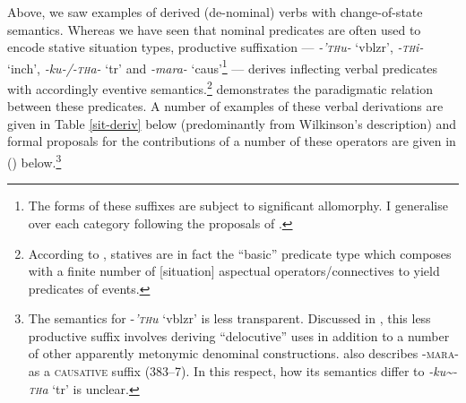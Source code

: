 


Above, we saw examples of derived (de-nominal) verbs with change-of-state semantics. Whereas we have seen that nominal predicates are often used to encode stative situation types, productive suffixation --- \textit{-’\textsc{th}u-} `\gls{vblzr}', \textit{-\textsc{th}i-} `\gls{inch}', \textit{-ku-/-\textsc{th}a-} `\gls{tr}' and \textit{-mara-} `\gls{caus}'\footnote{The forms of these  suffixes are subject to significant allomorphy. I generalise over each category following the proposals of \citet[§ 7.5]{Wilkinson1991}.} --- derives inflecting verbal predicates with accordingly eventive semantics.\footnote{According to \citet{Dowty1972,Dowty1979}, statives are in fact the ``basic'' predicate type which composes with a finite number of [situation] aspectual operators/connectives to yield predicates of events.} \citet{Wilkinson1991} demonstrates the paradigmatic relation between these predicates. A number of examples of these verbal derivations are given in Table \ref{sit-deriv} below (predominantly from Wilkinson's description) and formal proposals for the contributions of a number of these operators are given in (\nextx) below.\footnote{The semantics for -\textit{\textsc{'th}u} `\gls{vblzr}' is less transparent. Discussed in \citet[375--9]{Wilkinson1991}, this less productive suffix involves deriving ``delocutive'' uses in addition to a number of other apparently metonymic denominal constructions. \citeauthor{Wilkinson1991} also describes \textsc{-mara-} as a \textsc{causative} suffix (383--7). In this respect, how its semantics differ to \textit{-ku\textasciitilde-\textsc{th}a} `\gls{tr}' is unclear.}


